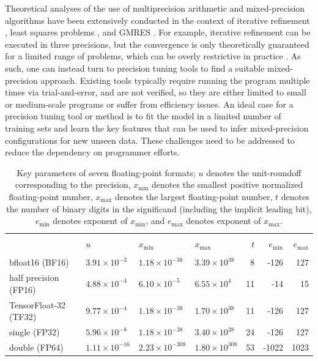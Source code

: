 \documentclass[Afour,sageh,times]{sagej}
\newcommand{\xy}[1]{{\color{black}{#1}}}
\theoremstyle{plain}
\theoremstyle{definition}
\begin{document}
Theoretical analyses of the use of multiprecision arithmetic and mixed-precision algorithms have been extensively conducted in the context of iterative refinement \citep{doi:10.1137/20M1316822, abhl24}, least squares problems \citep{doi:10.1137/19M1298263, doi:10.1137/20M1316822}, and GMRES \citep{jang:hal-05163845}. For example, iterative refinement can be executed in three precisions, but the convergence is only theoretically guaranteed for a limited range of problems, which can be overly restrictive in practice \citep{oktay2022multistage}. As such, one can instead turn to precision tuning tools to find a suitable mixed-precision approach. Existing tools typically require running the program multiple times via trial-and-error, and \xy{their scalability and generalization ability} are not verified, so they are either limited to small or medium-scale programs or suffer from efficiency issues.  An ideal case for a precision tuning tool or method is to fit the model in a limited number of training sets and learn the key features that can be used to infer mixed-precision configurations for new unseen data. These challenges need to be addressed to reduce the dependency on programmer efforts.

\begin{table}[ht!]
\caption{Key parameters of seven floating-point formats; $u$ denotes the unit-roundoff corresponding to the precision, $x_{\min}$ denotes the smallest positive normalized floating-point number, $x_{\max}$ denotes the largest floating-point number, $t$ denotes the number of binary digits in the significand (including the implicit leading bit), $e_{\min}$ denotes exponent of $x_{\min}$, and $e_{\max}$ denotes exponent of $x_{\max}$.} \small
\label{table:unitroundoff}
\centering \setlength\tabcolsep{5pt}
\begin{tabular}{l l l l r r r}
\hline\\[-2.5mm]
& \qquad $u$      & \quad $x_{\min}$  &    \quad $x_{\max}$  &  $t$    &  $e_{\min}$  & $e_{\max}$\\[1mm] \hline\\[-0.6mm]
bfloat16 (BF16) & $3.91 \times 10^{-3}$ & $1.18 \times 10^{-38}$ & $3.39 \times 10^{38}$ & 8 & -126 & 127 \\
half precision (FP16) & $4.88 \times 10^{-4}$ & $6.10 \times 10^{-5}$ & $6.55 \times 10^{4}$ & 11 & -14 & 15 \\
TensorFloat-32 (TF32) & $9.77 \times 10^{-4}$ & $1.18 \times 10^{-38}$ & $1.70 \times 10^{38}$ & 11 & -126 & 127 \\
single (FP32) & $5.96 \times 10^{-8}$ & $1.18 \times 10^{-38}$ & $3.40 \times 10^{38}$ & 24 & -126 & 127 \\
double (FP64) & $1.11 \times 10^{-16}$ & $2.23 \times 10^{-308}$ & $1.80 \times 10^{308}$ & 53 & -1022 & 1023 \\[1mm]
\hline %
\end{tabular}
\end{table}
\end{document}
